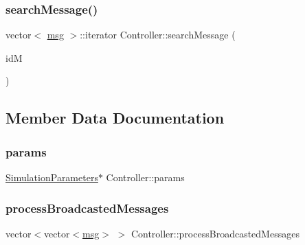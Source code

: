 \mbox{\label{class_controller_aa32d5c18e9e30caf2900527e42b93d44}} 
\subsubsection{\texorpdfstring{search\+Message()}{searchMessage()}}
{\footnotesize\ttfamily vector$<$ \hyperlink{_controller_8h_afa0f3b802fbc219228f7bb97996fa558}{msg} $>$\+::iterator Controller\+::search\+Message (\begin{DoxyParamCaption}\item[{\hyperlink{structures_8h_a83a1d9a070efa5341da84cfd8e28d3e5}{id\+Msg}}]{idM }\end{DoxyParamCaption})\hspace{0.3cm}{\ttfamily [private]}}



\subsection{Member Data Documentation}
\mbox{\label{class_controller_a81d7fe43b78ef7601e6b36c3df38ce79}} 
\subsubsection{\texorpdfstring{params}{params}}
{\footnotesize\ttfamily \hyperlink{class_simulation_parameters}{Simulation\+Parameters}$\ast$ Controller\+::params\hspace{0.3cm}{\ttfamily [private]}}

\mbox{\label{class_controller_ae96146dee6f60ecd94bfe40b9fc658ad}} 
\subsubsection{\texorpdfstring{process\+Broadcasted\+Messages}{processBroadcastedMessages}}
{\footnotesize\ttfamily vector$<$vector$<$\hyperlink{_controller_8h_afa0f3b802fbc219228f7bb97996fa558}{msg}$>$ $>$ Controller\+::process\+Broadcasted\+Messages\hspace{0.3cm}{\ttfamily [private]}}

